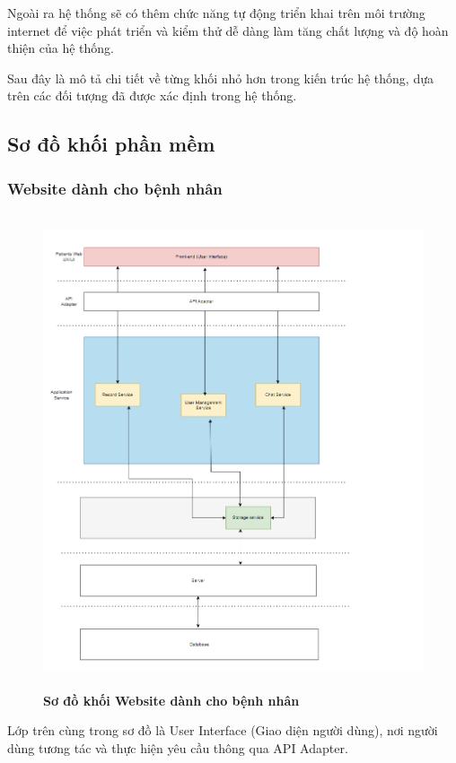 Ngoài ra hệ thống sẽ có thêm chức năng tự động triển khai trên môi trường internet để việc phát triển và kiểm thử dễ dàng 
làm tăng chất lượng và độ hoàn thiện của hệ thống.

Sau đây là mô tả chi tiết về từng khối nhỏ hơn trong kiến trúc hệ thống, dựa trên các đối tượng đã được xác định trong hệ thống.
\newpage
\subsection{Sơ đồ khối phần mềm}

\subsubsection{Website dành cho bệnh nhân}
\mbox{}

\begin{figure}[H]
  \centering
  \includegraphics[width=12cm,height=14cm]{Images/system/fmECG_architecture-Patient.drawio.png}
  \caption[Sơ đồ khối Website dành cho bệnh nhân]{\bfseries \fontsize{12pt}{0pt}\selectfont Sơ đồ khối Website dành cho bệnh nhân}
  \label{fmECG_architecture-Patient} %
\end{figure}
Lớp trên cùng trong sơ đồ là User Interface (Giao diện người dùng), nơi người dùng tương tác và thực hiện yêu cầu thông qua API Adapter. 
